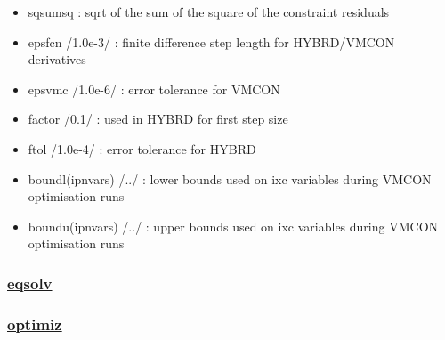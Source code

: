 \documentclass[
]{article}
\begin{document}
\begin{itemize}
\begin{itemize}
    (146) fcpttf : F-value for TF coil current per turn limit
    (constraint equation 77)
  \item
    (147) freinke : F-value for Reinke detachment criterion (constraint
    equation 78)
  \item
    (148) fzactual : fraction of impurity at SOL with Reinke detachment
    criterion
  \item
    (149) fbmaxcs : F-value for max peak CS field (con. 79, itvar 149)
  \item
    (150) plasmod\_fcdp : (P\_CD - Pheat)/(Pmax-Pheat),i.e. ratio of CD
    power over available power
  \item
    (151) plasmod\_fradc : Pline\_Xe / (Palpha + Paux - PlineAr - Psync
    - Pbrad)
  \item
    (152) fbmaxcs : Ratio of separatrix density to Greenwald density
  \end{itemize}
\item
  sqsumsq : sqrt of the sum of the square of the constraint residuals
\item
  epsfcn /1.0e-3/ : finite difference step length for HYBRD/VMCON
  derivatives
\item
  epsvmc /1.0e-6/ : error tolerance for VMCON
\item
  factor /0.1/ : used in HYBRD for first step size
\item
  ftol /1.0e-4/ : error tolerance for HYBRD
\item
  boundl(ipnvars) /../ : lower bounds used on ixc variables during VMCON
  optimisation runs
\item
  boundu(ipnvars) /../ : upper bounds used on ixc variables during VMCON
  optimisation runs
\end{itemize}

\hypertarget{eqsolv}{%
\subsubsection{\texorpdfstring{\href{eqsolv.html}{eqsolv}}{eqsolv}}\label{eqsolv}}

\hypertarget{optimiz}{%
\subsubsection{\texorpdfstring{\href{optimiz.html}{optimiz}}{optimiz}}\label{optimiz}}
\end{document}

